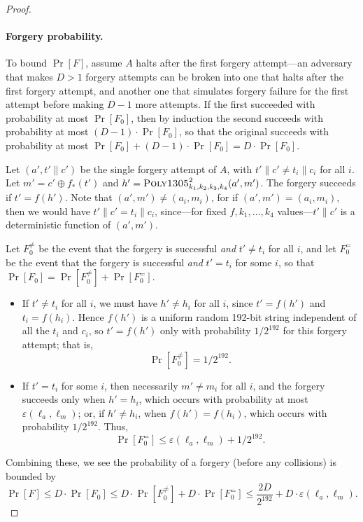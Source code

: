 \documentclass[draft]{article}
\DeclareRobustCommand{\operatorsc}[1]{{%
  \ifmmode\let\next=\operatorname\else\let\next=\relax\fi\next{\textsc{#1}}}}
\def\Poly#1/{\operatorsc{Poly#1}}
\newcommand{\concat}{\mathbin\|}
\newcommand{\collisionbound}{\varepsilon}
\begin{document}
\begin{proof}
\paragraph*{Forgery probability.}
To bound $\Pr[F]$, assume $A$ halts after the first forgery
 attempt---an adversary that makes $D>1$ forgery attempts can be broken
 into one that halts after the first forgery attempt, and another one
 that simulates forgery failure for the first attempt before making
 $D-1$ more attempts.
If the first succeeded with probability at most $\Pr[F_0]$, then by
 induction the second succeeds with probability at most
 $(D - 1) \cdot \Pr[F_0]$,
 so that the original succeeds with probability at most
 $\Pr[F_0] + (D - 1) \cdot \Pr[F_0] = D \cdot \Pr[F_0]$.

Let $(a', t' \concat c')$ be the single forgery attempt of $A$,
 with
 $t' \concat c' \ne t_i \concat c_i$
 for all $i$.
Let
 $m' = c' \oplus f_*(t')$
 and
 $h' = \Poly1305/^2_{k_1,k_2,k_3,k_4}(a', m')$.
The forgery succeeds if $t' = f(h')$.
Note that $(a', m') \ne (a_i, m_i)$, for if
 $(a', m') = (a_i, m_i)$,
 then we would have
 $t' \concat c' = t_i \concat c_i$, since---for fixed
 $f,k_1,\dotsc,k_4$ values---$t' \concat c'$ is a deterministic
 function of $(a', m')$.

Let $F_0^{\ne}$ be the event that the forgery is successful \emph{and}
 $t' \ne t_i$ for all $i$, and let $F_0^=$ be the event that the
 forgery is successful \emph{and} $t' = t_i$ for some $i$, so that
 $\Pr[F_0] = \Pr[F_0^{\ne}] + \Pr[F_0^=]$.
%
\begin{itemize}
  \item
    If $t' \ne t_i$ for all $i$, we must have $h' \ne h_i$ for all $i$,
     since $t' = f(h')$ and $t_i = f(h_i)$.
    Hence $f(h')$ is a uniform random 192-bit string independent of all
     the $t_i$ and $c_i$, so $t' = f(h')$ only with probability
     $1/2^{192}$ for this forgery attempt; that is,
    \[
      \Pr[F_0^{\ne}] = 1/2^{192}.
    \]
  \item
    If $t' = t_i$ for some $i$, then necessarily $m' \ne m_i$ for all
     $i$, and the forgery succeeds only when $h' = h_i$, which occurs
     with probability at most $\collisionbound(\ell_a, \ell_m)$; or, if
     $h' \ne h_i$, when $f(h') = f(h_i)$, which occurs with probability
     $1/2^{192}$.
    Thus,
    \[
      \Pr[F_0^=] \leq \collisionbound(\ell_a, \ell_m) + 1/2^{192}.
    \]
\end{itemize}
%
Combining these, we see the probability of a forgery (before any
 collisions) is bounded by
\[
  \Pr[F]
  \leq D \cdot \Pr[F_0]
  \leq D \cdot \Pr[F_0^{\ne}] + D \cdot \Pr[F_0^=]
  \leq \frac{2 D}{2^{192}} + D \cdot \collisionbound(\ell_a, \ell_m).
\]


\end{proof}
\end{document}
